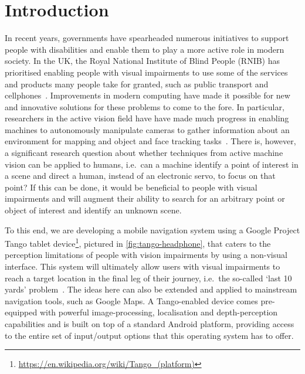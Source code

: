 \documentclass[sigconf, screen=true, anonymous=true]{acmart}
\begin{document}


\maketitle
\renewcommand{\shortauthors}{JC Lock et al.}

\section{Introduction}

In recent years, governments have spearheaded numerous initiatives to support people with disabilities and enable them to play a more active role in modern society.
In the UK, the Royal National Institute of Blind People (RNIB) has prioritised enabling people with visual impairments to use some of the services and products many people take for granted, such as public transport and cellphones~\cite{rnib-objectives}.
Improvements in modern computing have made it possible for new and innovative solutions for these problems to come to the fore.
In particular, researchers in the active vision field have have made much progress in enabling machines to autonomously manipulate cameras to gather information about an environment for mapping and object and face tracking tasks~\cite{bajcsy2018revisiting}.
There is, however, a significant research question about whether techniques from active machine vision can be applied to humans, i.e.\ can a machine identify a point of interest in a scene and direct a human, instead of an electronic servo, to focus on that point?
If this can be done, it would be beneficial to people with visual impairments and will augment their ability to search for an arbitrary point or object of interest and identify an unknown scene. 

To this end, we are developing a mobile navigation system using a Google Project Tango tablet device\footnote{\url{https://en.wikipedia.org/wiki/Tango_(platform)}}, pictured in \cref{fig:tango-headphone}, that caters to the perception limitations of people with vision impairments by using a non-visual interface.
This system will ultimately allow users with visual impairments to reach a target location in the final leg of their journey, i.e.\ the so-called `last 10 yards' problem~\cite{google2016blind,bellotto2013}. 
The ideas here can also be extended and applied to mainstream navigation tools, such as Google Maps.
A Tango-enabled device comes pre-equipped with powerful image-processing, localisation and depth-perception capabilities and is built on top of a standard Android platform, providing access to the entire set of input/output options that this operating system has to offer.
\end{document}
